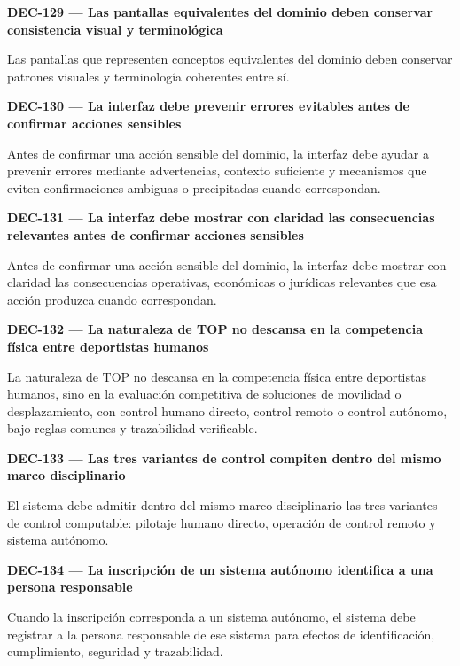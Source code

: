 \documentclass[10pt,letterpaper]{article}
\begin{document}
\noindent\textbf{DEC-129 --- Las pantallas equivalentes del dominio deben conservar consistencia visual y terminológica}\par
Las pantallas que representen conceptos equivalentes del dominio deben conservar patrones visuales y terminología coherentes entre sí.\par\vspace{0.45em}
\noindent\textbf{DEC-130 --- La interfaz debe prevenir errores evitables antes de confirmar acciones sensibles}\par
Antes de confirmar una acción sensible del dominio, la interfaz debe ayudar a prevenir errores mediante advertencias, contexto suficiente y mecanismos que eviten confirmaciones ambiguas o precipitadas cuando correspondan.\par\vspace{0.45em}
\noindent\textbf{DEC-131 --- La interfaz debe mostrar con claridad las consecuencias relevantes antes de confirmar acciones sensibles}\par
Antes de confirmar una acción sensible del dominio, la interfaz debe mostrar con claridad las consecuencias operativas, económicas o jurídicas relevantes que esa acción produzca cuando correspondan.\par\vspace{0.45em}
\noindent\textbf{DEC-132 --- La naturaleza de TOP no descansa en la competencia física entre deportistas humanos}\par
La naturaleza de TOP no descansa en la competencia física entre deportistas humanos, sino en la evaluación competitiva de soluciones de movilidad o desplazamiento, con control humano directo, control remoto o control autónomo, bajo reglas comunes y trazabilidad verificable.\par\vspace{0.45em}
\noindent\textbf{DEC-133 --- Las tres variantes de control compiten dentro del mismo marco disciplinario}\par
El sistema debe admitir dentro del mismo marco disciplinario las tres variantes de control computable: pilotaje humano directo, operación de control remoto y sistema autónomo.\par\vspace{0.45em}
\noindent\textbf{DEC-134 --- La inscripción de un sistema autónomo identifica a una persona responsable}\par
Cuando la inscripción corresponda a un sistema autónomo, el sistema debe registrar a la persona responsable de ese sistema para efectos de identificación, cumplimiento, seguridad y trazabilidad.\par\vspace{0.45em}
\end{document}
